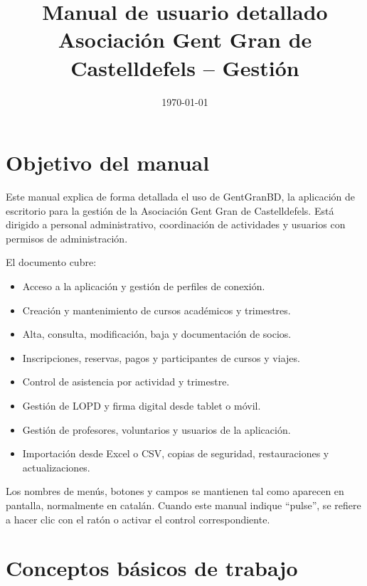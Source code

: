 \documentclass[12pt]{article}
\title{Manual de usuario detallado\\Asociación Gent Gran de Castelldefels -- Gestión}
\author{}
\date{\today}
\begin{document}
\maketitle
\tableofcontents
\newpage

\section{Objetivo del manual}
Este manual explica de forma detallada el uso de GentGranBD, la aplicación de escritorio para la gestión de la Asociación Gent Gran de Castelldefels. Está dirigido a personal administrativo, coordinación de actividades y usuarios con permisos de administración.

El documento cubre:
\begin{itemize}
  \item Acceso a la aplicación y gestión de perfiles de conexión.
  \item Creación y mantenimiento de cursos académicos y trimestres.
  \item Alta, consulta, modificación, baja y documentación de socios.
  \item Inscripciones, reservas, pagos y participantes de cursos y viajes.
  \item Control de asistencia por actividad y trimestre.
  \item Gestión de LOPD y firma digital desde tablet o móvil.
  \item Gestión de profesores, voluntarios y usuarios de la aplicación.
  \item Importación desde Excel o CSV, copias de seguridad, restauraciones y actualizaciones.
\end{itemize}

Los nombres de menús, botones y campos se mantienen tal como aparecen en pantalla, normalmente en catalán. Cuando este manual indique ``pulse'', se refiere a hacer clic con el ratón o activar el control correspondiente.

\section{Conceptos básicos de trabajo}
\end{document}
